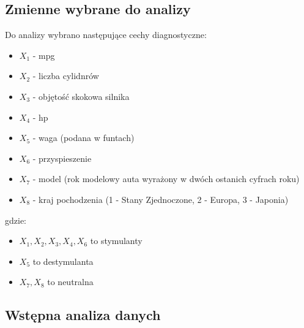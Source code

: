\documentclass{article}
\begin{document}
    \subsection{Zmienne wybrane do analizy} %
    Do analizy wybrano następujące cechy diagnostyczne:
    \begin{itemize}
        \item ${X_1}$ - mpg
        \item ${X_2}$ - liczba cylidnrów 
        \item ${X_3}$ - objętość skokowa silnika
        \item ${X_4}$ - hp
        \item ${X_5}$ - waga (podana w funtach)
        \item ${X_6}$ - przyspieszenie
        \item ${X_7}$ - model (rok modelowy auta wyrażony w dwóch ostanich cyfrach roku)
        \item ${X_8}$ - kraj pochodzenia (1 - Stany Zjednoczone, 2 - Europa, 3 - Japonia)
    \end{itemize}
    gdzie:
    \begin{itemize}
        \item ${X_1, X_2, X_3, X_4, X_6}$ to stymulanty
        \item ${X_5}$ to destymulanta
        \item ${X_7, X_8}$ to neutralna
    \end{itemize}
    
    
    \subsection{Wstępna analiza danych}
\end{document}
